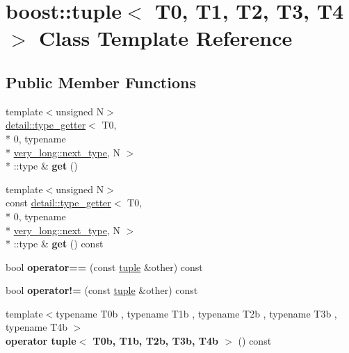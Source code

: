 \hypertarget{classboost_1_1tuple}{\section{boost\+:\+:tuple$<$ T0, T1, T2, T3, T4 $>$ Class Template Reference}
\label{classboost_1_1tuple}
}
\subsection*{Public Member Functions}
\begin{DoxyCompactItemize}
\item 
\hypertarget{classboost_1_1tuple_a14447ab8e4c5e54b51dd052227d1d11c}{{\footnotesize template$<$unsigned N$>$ }\\\hyperlink{structboost_1_1detail_1_1type__getter}{detail\+::type\+\_\+getter}$<$ T0, \\*
0, typename \\*
\hyperlink{structboost_1_1detail_1_1list__elem}{very\+\_\+long\+::next\+\_\+type}, N $>$\\*
\+::type \& {\bfseries get} ()}\label{classboost_1_1tuple_a14447ab8e4c5e54b51dd052227d1d11c}

\item 
\hypertarget{classboost_1_1tuple_a0a1f83aae9090f37b329f9e699c65f6c}{{\footnotesize template$<$unsigned N$>$ }\\const \hyperlink{structboost_1_1detail_1_1type__getter}{detail\+::type\+\_\+getter}$<$ T0, \\*
0, typename \\*
\hyperlink{structboost_1_1detail_1_1list__elem}{very\+\_\+long\+::next\+\_\+type}, N $>$\\*
\+::type \& {\bfseries get} () const }\label{classboost_1_1tuple_a0a1f83aae9090f37b329f9e699c65f6c}

\item 
\hypertarget{classboost_1_1tuple_a1e7cb959f3af4779a9776b79ae095db4}{bool {\bfseries operator==} (const \hyperlink{classboost_1_1tuple}{tuple} \&other) const }\label{classboost_1_1tuple_a1e7cb959f3af4779a9776b79ae095db4}

\item 
\hypertarget{classboost_1_1tuple_ae19cce73555200514e0e4d5c212a59b6}{bool {\bfseries operator!=} (const \hyperlink{classboost_1_1tuple}{tuple} \&other) const }\label{classboost_1_1tuple_ae19cce73555200514e0e4d5c212a59b6}

\item 
\hypertarget{classboost_1_1tuple_a5c723236f2d0d81fbaef5c53a9cf70dc}{{\footnotesize template$<$typename T0b , typename T1b , typename T2b , typename T3b , typename T4b $>$ }\\{\bfseries operator tuple$<$ T0b, T1b, T2b, T3b, T4b $>$} () const }\label{classboost_1_1tuple_a5c723236f2d0d81fbaef5c53a9cf70dc}

\end{DoxyCompactItemize}
